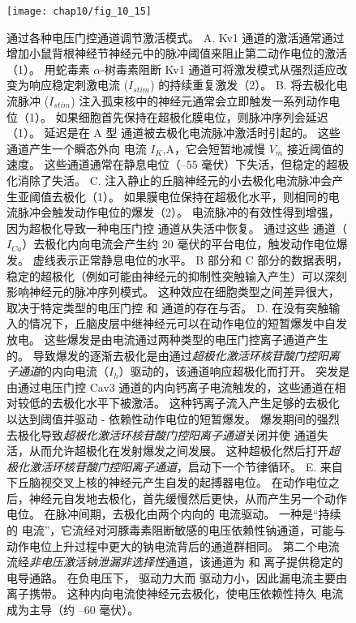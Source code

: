 \begin{figure}[htbp]
	\centering
	\texttt{[image: chap10/fig\_10\_15]}
	\caption{通过各种电压门控通道调节激活模式。
		A. Kv1 通道的激活通常通过增加小鼠背根神经节神经元中的脉冲阈值来阻止第二动作电位的激活（1）。
		用蛇毒素 $\alpha$-树毒素阻断 Kv1 通道可将激发模式从强烈适应改变为响应稳定刺激电流 ($I_{stim}$) 的持续重复激发（2）。
		B. 将去极化电流脉冲 ($I_{stim}$) 注入孤束核中的神经元通常会立即触发一系列动作电位（1）。
		如果细胞首先保持在超极化膜电位，则脉冲序列会延迟（1）。
		延迟是在 A 型  通道被去极化电流脉冲激活时引起的。
		这些通道产生一个瞬态外向  电流 $I_K$,A，它会短暂地减慢 $V_m$ 接近阈值的速度。
		这些通道通常在静息电位（–55 毫伏）下失活，但稳定的超极化消除了失活\cite{dekin1987vitro}。
		C. 注入静止的丘脑神经元的小去极化电流脉冲会产生亚阈值去极化（1）。
		如果膜电位保持在超极化水平，则相同的电流脉冲会触发动作电位的爆发（2）。
		电流脉冲的有效性得到增强，因为超极化导致一种电压门控  通道从失活中恢复。
		通过这些  通道（$I_{Ca}$）去极化内向电流会产生约 20 毫伏的平台电位，触发动作电位爆发。
		虚线表示正常静息电位的水平\cite{llinas1982electrophysiology}。
		B 部分和 C 部分的数据表明，稳定的超极化（例如可能由神经元的抑制性突触输入产生）可以深刻影响神经元的脉冲序列模式。
		这种效应在细胞类型之间差异很大，取决于特定类型的电压门控  和  通道的存在与否。
		D. 在没有突触输入的情况下，丘脑皮层中继神经元可以在动作电位的短暂爆发中自发放电。
		这些爆发是由电流通过两种类型的电压门控离子通道产生的。
		导致爆发的逐渐去极化是由通过\textit{超极化激活环核苷酸门控阳离子通道}的内向电流（$I_h$）驱动的，该通道响应超极化而打开。
		突发是由通过电压门控 Cav3 通道的内向钙离子电流触发的，这些通道在相对较低的去极化水平下被激活。
		这种钙离子流入产生足够的去极化以达到阈值并驱动 - 依赖性动作电位的短暂爆发。
		爆发期间的强烈去极化导致\textit{超极化激活环核苷酸门控阳离子通道}关闭并使  通道失活，从而允许超极化在发射爆发之间发展。
		这种超极化然后打开\textit{超极化激活环核苷酸门控阳离子通道}，启动下一个节律循环\cite{mccormick1992model}。
		E. 来自下丘脑视交叉上核的神经元产生自发的起搏器电位。
		在动作电位之后，神经元自发地去极化，首先缓慢然后更快，从而产生另一个动作电位。
		在脉冲间期，去极化由两个内向的  电流驱动。
		一种是“持续的  电流”，它流经对河豚毒素阻断敏感的电压依赖性钠通道，可能与动作电位上升过程中更大的钠电流背后的通道群相同。
		第二个电流流经\textit{非电压激活钠泄漏非选择性}通道，该通道为  和  离子提供稳定的电导通路。
		在负电压下， 驱动力大而  驱动力小，因此漏电流主要由  离子携带。
		这种内向电流使神经元去极化，使电压依赖性持久  电流成为主导（约 –60 毫伏）\cite{jackson2004mechanism}。}
	\label{fig:10_15}
\end{figure}


